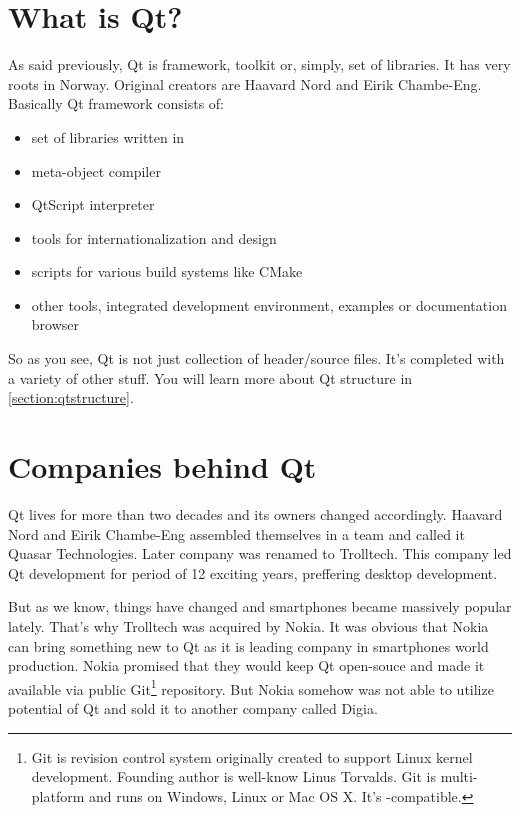 \section{What is Qt?}\label{section:what}
As said previously, Qt is framework, toolkit or, simply, set of libraries. It has very roots in Norway. Original creators are Haavard Nord and Eirik Chambe-Eng. Basically Qt framework consists of:
\begin{itemize}
\item set of libraries written in \cpp
\item meta-object compiler
\item QtScript interpreter
\item tools for internationalization and  design
\item scripts for various build systems like CMake
\item other tools, \eg integrated development environment, examples or documentation browser
\end{itemize}

So as you see, Qt is not just collection of header/source files. It's completed with a variety of other stuff. You will learn more about Qt structure in \autoref{section:qtstructure}.

\section{Companies behind Qt}
Qt lives for more than two decades and its owners changed accordingly. Haavard Nord and Eirik Chambe-Eng assembled themselves in a team and called it Quasar Technologies. Later company was renamed to Trolltech. This company led Qt development for period of 12 exciting years, preffering desktop development.


But as we know, things have changed and smartphones became massively popular lately. That's why Trolltech was acquired by Nokia. It was obvious that Nokia can bring something new to Qt as it is leading company in smartphones world production. Nokia promised that they would keep Qt open-souce and made it available via public Git\footnote{Git is revision control system originally created to support Linux kernel development. Founding author is well-know Linus Torvalds. Git is multi-platform and runs on Windows, Linux or Mac OS X. It's -compatible.} repository. But Nokia somehow was not able to utilize potential of Qt and sold it to another company called Digia.


